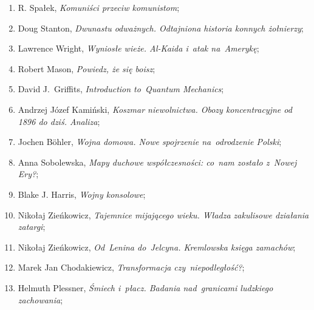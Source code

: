\documentclass[a4paper,11pt]{article}
\begin{document}
\begin{enumerate}
\item R. Spałek, \textit{Komuniści przeciw komunistom};



\item Doug Stanton, \textit{Dwunastu odważnych. Odtajniona historia
    konnych żołnierzy};



\item Lawrence Wright, \textit{Wyniosłe wieże. Al-Kaida i~atak
    na~Amerykę};



\item Robert Mason, \textit{Powiedz, że się boisz};



\item David J.~Griffits, \textit{Introduction to~Quantum Mechanics};



\item Andrzej Józef Kamiński, \textit{Koszmar niewolnictwa. Obozy
    koncentracyjne od 1896 do dziś. Analiza};



\item Jochen B\"{o}hler, \textit{Wojna domowa. Nowe spojrzenie
    na~odrodzenie Polski};



\item Anna Sobolewska, \textit{Mapy duchowe współczesności: co~nam
    zostało z~Nowej Ery?};



\item Blake J. Harris, \textit{Wojny konsolowe};



\item Nikołaj Zieńkowicz, \textit{Tajemnice mijającego wieku. Władza
    zakulisowe działania zatargi};



\item Nikołaj Zieńkowicz, \textit{Od~Lenina do~Jelcyna. Kremlowska
    księga zamachów};



\item Marek Jan Chodakiewicz, \textit{Transformacja czy~niepodległość?};



\item Helmuth Plessner, \textit{Śmiech i~płacz. Badania nad~granicami
    ludzkiego zachowania};




\end{enumerate}
\end{document}
